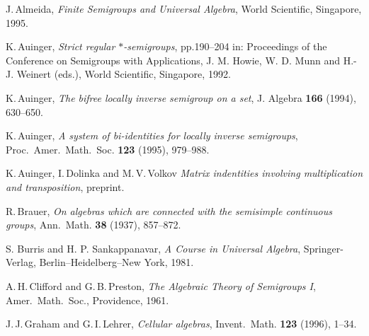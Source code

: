 \documentclass[11pt,reqno]{amsart}
\numberwithin{equation}{section}
\theoremstyle{remark}
\begin{document}
\begin{thebibliography}{99}
J.\,Almeida, \emph{Finite Semigroups and Universal Algebra}, World
Scientific, Singapore, 1995.


K.\,Auinger, \emph{Strict regular $*$-semigroups}, pp.190--204 in:
Proceedings of the Conference on Semigroups with Applications, J.
M. Howie, W. D. Munn and H.-J. Weinert (eds.), World Scientific,
Singapore, 1992.

K.\,Auinger, \emph{The bifree locally inverse semigroup on a set},
J. Algebra \textbf{ 166} (1994), 630--650.

K.\,Auinger, \emph{A system of bi-identities for locally inverse
semigroups}, Proc.\ Amer.\ Math.\ Soc. \textbf{ 123} (1995),
979--988.

 K.\,Auinger, I.\,Dolinka and M.\,V.\,Volkov \emph{Matrix indentities involving multiplication and transposition}, preprint.

R.\,Brauer, \emph{On algebras which are connected with the
semisimple continuous groups}, Ann.\ Math. \textbf{38} (1937),
857--872.


S. Burris and H. P. Sankappanavar, \emph{A Course in Universal
Algebra}, Springer-Verlag, Berlin--Heidelberg--New York, 1981.

A.\,H.\,Clifford and G.\,B.\,Preston, \emph{The Algebraic Theory
of Semigroups I}, Amer.\ Math.\ Soc., Providence, 1961.




J.\,J.\,Graham and G.\,I.\,Lehrer, \emph{Cellular algebras},
Invent.\ Math. \textbf{123} (1996), 1--34.


\end{thebibliography}
\end{document}
